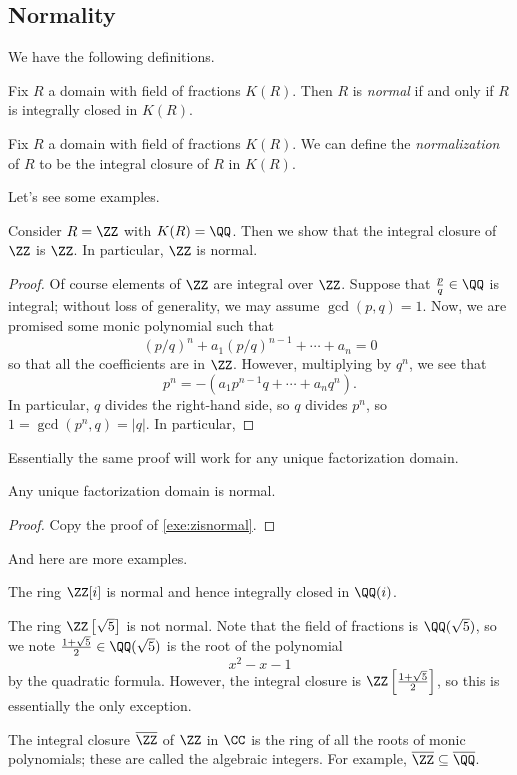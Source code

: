 \subsection{Normality}
We have the following definitions.
\begin{definition}[Normal]
	Fix $R$ a domain with field of fractions $K(R)$. Then $R$ is \textit{normal} if and only if $R$ is integrally closed in $K(R)$.
\end{definition}
\begin{definition}[Normalization]
	Fix $R$ a domain with field of fractions $K(R)$. We can define the \textit{normalization} of $R$ to be the integral closure of $R$ in $K(R)$.
\end{definition}
Let's see some examples.
\begin{exe} \label{exe:zisnormal}
	Consider $R=\ZZ$ with $K(R)=\QQ$. Then we show that the integral closure of $\ZZ$ is $\ZZ$. In particular, $\ZZ$ is normal.
\end{exe}
\begin{proof}
	Of course elements of $\ZZ$ are integral over $\ZZ$. Suppose that $\frac pq\in\QQ$ is integral; without loss of generality, we may assume $\gcd(p,q)=1$. Now, we are promised some monic polynomial such that
	\[(p/q)^n+a_1(p/q)^{n-1}+\cdots+a_n=0\]
	so that all the coefficients are in $\ZZ$. However, multiplying by $q^n$, we see that
	\[p^n=-\left(a_1p^{n-1}q+\cdots+a_nq^n\right).\]
	In particular, $q$ divides the right-hand side, so $q$ divides $p^n$, so $1=\gcd(p^n,q)=|q|$. In particular, 
\end{proof}
Essentially the same proof will work for any unique factorization domain.
\begin{proposition}
	Any unique factorization domain is normal.
\end{proposition}
\begin{proof}
	Copy the proof of \autoref{exe:zisnormal}.
\end{proof}
And here are more examples.
\begin{example}
	The ring $\ZZ[i]$ is normal and hence integrally closed in $\QQ(i)$.
\end{example}
\begin{nex}
	The ring $\ZZ\left[\sqrt5\right]$ is not normal. Note that the field of fractions is $\QQ(\sqrt5)$, so we note $\frac{1+\sqrt5}2\in\QQ(\sqrt5)$ is the root of the polynomial
	\[x^2-x-1\]
	by the quadratic formula. However, the integral closure is $\ZZ\left[\frac{1+\sqrt5}2\right]$, so this is essentially the only exception.
\end{nex}
\begin{example}
	The integral closure $\overline\ZZ$ of $\ZZ$ in $\CC$ is the ring of all the roots of monic polynomials; these are called the algebraic integers. For example, $\overline\ZZ\subseteq\overline\QQ$.
\end{example}

